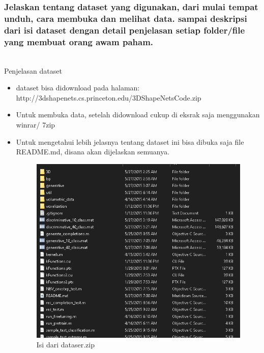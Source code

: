 \subsubsection{Jelaskan tentang dataset yang digunakan, dari mulai tempat unduh, cara membuka dan melihat data. sampai deskripsi dari isi dataset dengan detail penjelasan setiap folder/file yang membuat orang awam paham.}
\hfill\\
Penjelasan dataset
\begin{itemize}
	\item dataset bisa didownload pada halaman: http://3dshapenets.cs.princeton.edu/3DShapeNetsCode.zip
	\item Untuk membuka data, setelah didownload cukup di eksrak saja menggunakan winrar/ 7zip
	\item Untuk mengetahui lebih jelasnya tentang dataset ini bisa dibuka saja file README.md, disana akan dijelaskan semuanya.
\begin{figure}[H]
	\centering
	\includegraphics[scale=0.5]{figures/1174079/8/3dsnap.png}
	\caption{Isi dari dataser.zip}
\end{figure}

\end{itemize}

